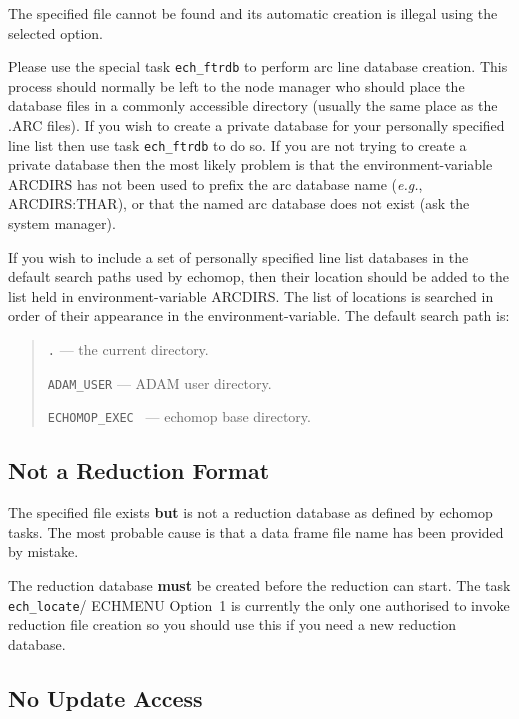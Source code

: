 \documentclass[11pt,twoside]{article}
\newcommand{\htmlref}[2]{#1}
\newcommand{\xlabel}[1]{}
\newcommand{\mlabel}[1]{\xlabel{#1}\label{#1}}
\newcommand{\myindex}[1]{\index{#1}}
\renewcommand{\myindex}[1]{}
\begin{document}
The specified file cannot be found and its automatic creation is illegal
using the selected option.

Please use the special task \texttt{ech\_ftrdb} to perform arc line database
creation. This process should normally be left to the node manager
who should place the database files in a commonly accessible
directory (usually the same place as the .ARC files). \myindex{Arc line
database creation} If you wish to create a private database for your
personally specified line list then use task \texttt{ech\_ftrdb} to do so. If
you are not trying to create a private database then the most likely
problem is that the environment-variable ARCDIRS has not been used to prefix
the arc database name ({\it{e.g.}}, ARCDIRS:THAR),
or that the named arc database does not exist (ask the system
manager).

If you wish to include a set of personally specified line list databases
in the default search paths used by {\sc echomop,} then their location should
be added to the list held in environment-variable ARCDIRS.  The list of
locations is searched in order of their appearance in the
environment-variable.  The default search path is:

\begin{quote}

   {\tt .} --- the current directory.

   {\tt ADAM\_USER} --- ADAM user directory.

   {\tt ECHOMOP\_EXEC } --- {\sc echomop} base directory.

\end{quote}

\subsection{\mlabel{not_a_reduction_format} Not a Reduction Format}

The specified file exists {\bf but} is not a reduction database as
defined by {\sc echomop} tasks. The most probable cause is that a data frame
file name has been provided by mistake.

The reduction database {\bf must} be created before the reduction
can start. The task
\htmlref{{\tt ech\_locate}/ ECHMENU Option~1}{ech_locate}
is currently the only one authorised to invoke reduction file creation so you
should use this if you need a new reduction database.

\subsection{\mlabel{no_update_access} No Update Access}
\end{document}
